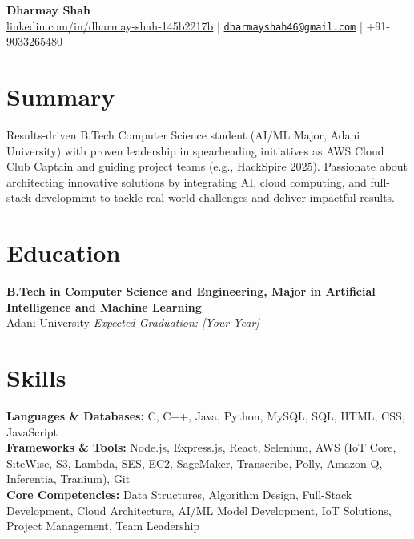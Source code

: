 \documentclass[10pt,a4paper]{article}
\begin{document}
\pagestyle{empty}

\begin{center}
    {\Large \textbf{Dharmay Shah}} \\[1pt]
    \href{https://www.linkedin.com/in/dharmay-shah-145b2217b/}{linkedin.com/in/dharmay-shah-145b2217b} | \href{mailto:dharmayshah46@gmail.com}{\texttt{dharmayshah46@gmail.com}} | +91-9033265480
\end{center}

\section*{Summary}
\begin{RaggedRight}
Results-driven B.Tech Computer Science student (AI/ML Major, Adani University) with proven leadership in spearheading initiatives as AWS Cloud Club Captain and guiding project teams (e.g., HackSpire 2025). Passionate about architecting innovative solutions by integrating AI, cloud computing, and full-stack development to tackle real-world challenges and deliver impactful results.
\end{RaggedRight}

\section*{Education}
\textbf{B.Tech in Computer Science and Engineering, Major in Artificial Intelligence and Machine Learning} \\Adani University \hfill \textit{Expected Graduation: [Your Year]}

\section*{Skills}
\textbf{Languages \& Databases:} C, C++, Java, Python, MySQL, SQL, HTML, CSS, JavaScript \\
\textbf{Frameworks \& Tools:} Node.js, Express.js, React, Selenium, AWS (IoT Core, SiteWise, S3, Lambda, SES, EC2, SageMaker, Transcribe, Polly, Amazon Q, Inferentia, Tranium), Git \\
\textbf{Core Competencies:} Data Structures, Algorithm Design, Full-Stack Development, Cloud Architecture, AI/ML Model Development, IoT Solutions, Project Management, Team Leadership
\end{document}
